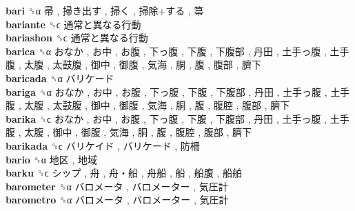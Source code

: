 \textbf{bari} ␝α   帚 ,  掃き出す ,  掃く ,  掃除+する ,  箒   \\
\textbf{bariante} ␝ϲ   通常と異なる行動   \\
\textbf{bariashon} ␝ϲ   通常と異なる行動   \\
\textbf{barica} ␝α   おなか ,  お中 ,  お腹 ,  下っ腹 ,  下腹 ,  下腹部 ,  丹田 ,  土手っ腹 ,  土手腹 ,  太腹 ,  太鼓腹 ,  御中 ,  御腹 ,  気海 ,  胴 ,  腹 ,  腹部 ,  臍下   \\
\textbf{baricada} ␝α   バリケード   \\
\textbf{bariga} ␝α   おなか ,  お中 ,  お腹 ,  下っ腹 ,  下腹 ,  下腹部 ,  丹田 ,  土手っ腹 ,  土手腹 ,  太腹 ,  太鼓腹 ,  御中 ,  御腹 ,  気海 ,  胴 ,  腹 ,  腹腔 ,  腹部 ,  臍下   \\
\textbf{barika} ␝ϲ   おなか ,  お中 ,  お腹 ,  下っ腹 ,  下腹 ,  下腹部 ,  丹田 ,  土手っ腹 ,  土手腹 ,  太腹 ,  御中 ,  御腹 ,  気海 ,  胴 ,  腹 ,  腹腔 ,  腹部 ,  臍下   \\
\textbf{barikada} ␝ϲ   バリケイド ,  バリケード ,  防柵   \\
\textbf{bario} ␝α   地区 ,  地域   \\
\textbf{barku} ␝ϲ   シップ ,  舟 ,  舟・船 ,  舟船 ,  船 ,  船腹 ,  船舶   \\
\textbf{barometer} ␝α   バロメータ ,  バロメーター ,  気圧計   \\
\textbf{barometro} ␝α   バロメータ ,  バロメーター ,  気圧計   \\
